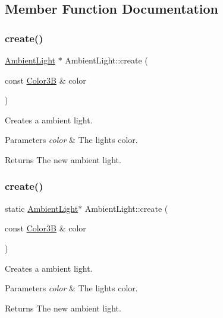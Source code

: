 \subsection{Member Function Documentation}
\mbox{\label{classAmbientLight_a0182a4fa9a333b108430174233dacddb}} 
\subsubsection{\texorpdfstring{create()}{create()}\hspace{0.1cm}{\footnotesize\ttfamily [1/2]}}
{\footnotesize\ttfamily \hyperlink{classAmbientLight}{Ambient\+Light} $\ast$ Ambient\+Light\+::create (\begin{DoxyParamCaption}\item[{const \hyperlink{structColor3B}{Color3B} \&}]{color }\end{DoxyParamCaption})\hspace{0.3cm}{\ttfamily [static]}}

Creates a ambient light. 
\begin{DoxyParams}{Parameters}
{\em color} & The light\textquotesingle{}s color.\\
\hline
\end{DoxyParams}
\begin{DoxyReturn}{Returns}
The new ambient light. 
\end{DoxyReturn}
\mbox{\label{classAmbientLight_a2179268c3ccb5b8a9f724129e28e1d47}} 
\subsubsection{\texorpdfstring{create()}{create()}\hspace{0.1cm}{\footnotesize\ttfamily [2/2]}}
{\footnotesize\ttfamily static \hyperlink{classAmbientLight}{Ambient\+Light}$\ast$ Ambient\+Light\+::create (\begin{DoxyParamCaption}\item[{const \hyperlink{structColor3B}{Color3B} \&}]{color }\end{DoxyParamCaption})\hspace{0.3cm}{\ttfamily [static]}}

Creates a ambient light. 
\begin{DoxyParams}{Parameters}
{\em color} & The light\textquotesingle{}s color.\\
\hline
\end{DoxyParams}
\begin{DoxyReturn}{Returns}
The new ambient light. 
\end{DoxyReturn}
\mbox{\label{classAmbientLight_acde40671ef0fa809c5827cf0fefe52a5}} 
